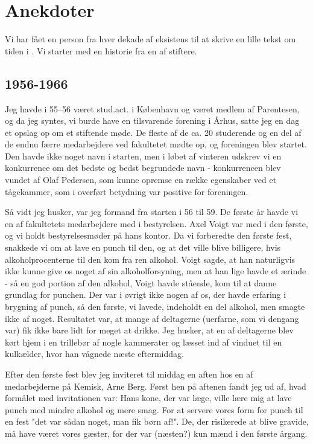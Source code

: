 \chapter{Anekdoter}
Vi har fået en person fra hver dekade af \TKETs eksistens til at skrive en lille
tekst om tiden i \TKET . Vi starter med en historie fra en af \TKETs stiftere.
\section{1956-1966}

Jeg havde i 55–56 været stud.act. i København og været medlem af Parentesen, og da jeg syntes, vi burde have en tilsvarende forening i Århus, satte jeg en dag et opslag op om et stiftende møde. De fleste af de ca. 20 studerende og en del af de endnu færre medarbejdere ved fakultetet mødte op, og foreningen blev startet. Den havde ikke noget navn i starten, men i løbet af vinteren udskrev vi en konkurrence om det bedste og bedst begrundede navn - konkurrencen blev vundet af Olaf Pedersen, som kunne opremse en række egenskaber ved et tågekammer, som i overført betydning var positive for foreningen.

Så vidt jeg husker, var jeg formand fra starten i 56 til 59. De første år havde vi en af fakultetets medarbejdere med i bestyrelsen. Axel Voigt var med i den første, og vi holdt bestyrelsesmøder på hans kontor. Da vi forberedte den første fest, snakkede vi om at lave en punch til den, og at det ville blive billigere, hvis alkoholprocenterne til den kom fra ren alkohol. Voigt sagde, at han naturligvis ikke kunne give os noget af sin alkoholforsyning, men at han lige havde et ærinde - så en god portion af den alkohol, Voigt havde stående, kom til at danne grundlag for punchen. Der var i øvrigt ikke nogen af os, der havde erfaring i brygning af punch, så den første, vi lavede, indeholdt en del alkohol, men smagte ikke af noget. Resultatet var, at mange af deltagerne (uerfarne, som vi dengang var) fik ikke bare lidt for meget at drikke. Jeg husker, at en af deltagerne blev kørt hjem i en trillebør af nogle kammerater og læsset ind af vinduet til en kulkælder, hvor han vågnede næste eftermiddag.

Efter den første fest blev jeg inviteret til middag en aften hos en af medarbejderne på Kemisk, Arne Berg. Først hen på aftenen fandt jeg ud af, hvad formålet med invitationen var: Hans kone, der var læge, ville lære mig at lave punch med mindre alkohol og mere smag. For at servere vores form for punch til en fest "det var sådan noget, man fik børn af!". De, der risikerede at blive gravide, må have været vores gæster, for der var (næsten?) kun mænd i den første årgang.


